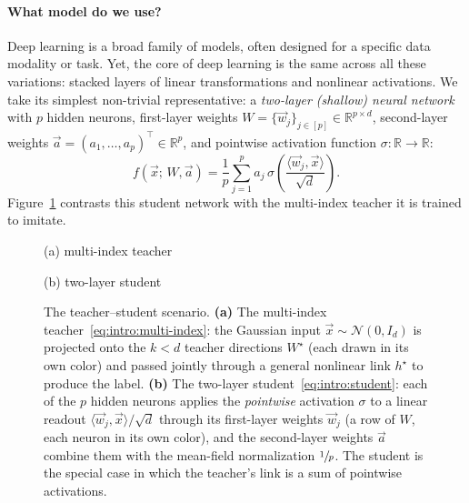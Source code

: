 \paragraph{What model do we use?}
Deep learning is a broad family of models, often designed for a specific data modality or task.
Yet, the core of deep learning is the same across all these variations: stacked layers of linear transformations and nonlinear activations.
We take its simplest non-trivial representative: a \emph{two-layer (shallow) neural
network} with $p$ hidden neurons, first-layer weights
$W = \{\vec{w}_j\}_{j \in [p]} \in \mathbb{R}^{p \times d}$, second-layer weights
$\vec{a} = (a_1, \ldots, a_p)^\top \in \mathbb{R}^p$, and pointwise activation
function $\sigma : \mathbb{R} \to \mathbb{R}$:
\begin{equation}
\label{eq:intro:student}
    f(\vec{x};\, W, \vec{a})
    = \frac{1}{p} \sum_{j=1}^p a_j\,\sigma\!\left(\frac{\langle \vec{w}_j,
    \vec{x}\rangle}{\sqrt{d}}\right).
\end{equation}
Figure~\ref{intro:fig:teacher-student} contrasts this student network with the
multi-index teacher it is trained to imitate.

\begin{figure}[t]
  \centering
  \begin{minipage}[b]{0.49\linewidth}
    \centering
    \resizebox{\linewidth}{!}{}\par\smallskip
    {\footnotesize (a) multi-index teacher}
  \end{minipage}\hfill
  \begin{minipage}[b]{0.49\linewidth}
    \centering
    \resizebox{\linewidth}{!}{}\par\smallskip
    {\footnotesize (b) two-layer student}
  \end{minipage}
  \caption[The teacher--student scenario.]{%
    The teacher--student scenario.
    \textbf{(a)} The multi-index teacher~\eqref{eq:intro:multi-index}: the Gaussian
    input $\vec{x}\sim\mathcal{N}(0,I_d)$ is projected onto the $k<d$ teacher
    directions $W^\star$ (each drawn in its own color) and passed jointly through
    a general nonlinear link $h^\star$ to produce the label.
    \textbf{(b)} The two-layer student~\eqref{eq:intro:student}: each of the $p$
    hidden neurons applies the \emph{pointwise} activation $\sigma$ to a linear
    readout $\langle\vec{w}_j, \vec{x}\rangle/\sqrt{d}$ through its first-layer weights
    $\vec{w}_j$ (a row of $W$, each neuron in its own color), and the
    second-layer weights $\vec{a}$ combine them with the mean-field
    normalization $\sfrac{1}{p}$.
    The student is the special case in which the teacher's link is a sum of
    pointwise activations.}
  \label{intro:fig:teacher-student}
\end{figure}

